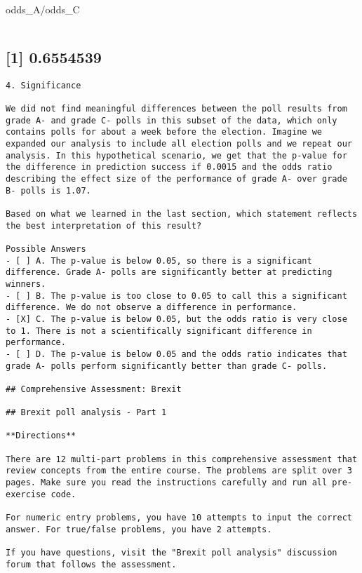 \documentclass[
]{article}
\begin{document}
odds\_A/odds\_C

\begin{verbatim}
\end{verbatim}

\hypertarget{section-9}{%
\subsection{{[}1{]} 0.6554539}\label{section-9}}

\begin{verbatim}
4. Significance

We did not find meaningful differences between the poll results from grade A- and grade C- polls in this subset of the data, which only contains polls for about a week before the election. Imagine we expanded our analysis to include all election polls and we repeat our analysis. In this hypothetical scenario, we get that the p-value for the difference in prediction success if 0.0015 and the odds ratio describing the effect size of the performance of grade A- over grade B- polls is 1.07.

Based on what we learned in the last section, which statement reflects the best interpretation of this result?

Possible Answers
- [ ] A. The p-value is below 0.05, so there is a significant difference. Grade A- polls are significantly better at predicting winners.
- [ ] B. The p-value is too close to 0.05 to call this a significant difference. We do not observe a difference in performance.
- [X] C. The p-value is below 0.05, but the odds ratio is very close to 1. There is not a scientifically significant difference in performance.
- [ ] D. The p-value is below 0.05 and the odds ratio indicates that grade A- polls perform significantly better than grade C- polls.

## Comprehensive Assessment: Brexit

## Brexit poll analysis - Part 1

**Directions**

There are 12 multi-part problems in this comprehensive assessment that review concepts from the entire course. The problems are split over 3 pages. Make sure you read the instructions carefully and run all pre-exercise code.

For numeric entry problems, you have 10 attempts to input the correct answer. For true/false problems, you have 2 attempts.

If you have questions, visit the "Brexit poll analysis" discussion forum that follows the assessment.


\end{verbatim}
\end{document}
